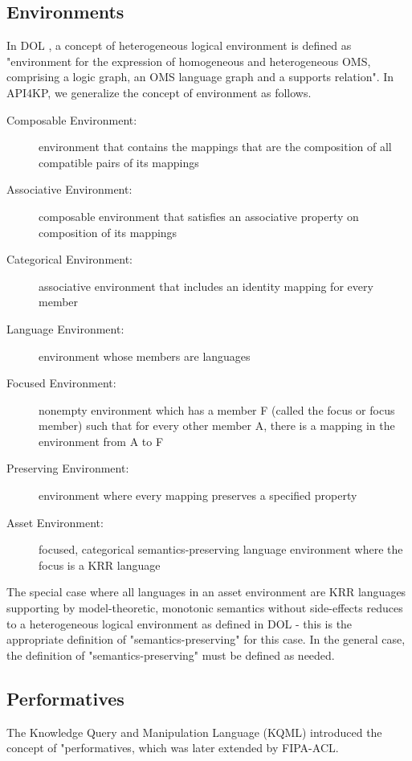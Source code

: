 \documentclass[runningheads]{llncs}
\begin{document}
\subsection{Environments}
In DOL , a concept of heterogeneous logical environment is defined as 
"environment for the
expression of homogeneous and heterogeneous OMS, comprising
a logic graph, an OMS language graph and a supports relation".
In API4KP, we generalize the concept of environment as follows.
\label{krassetenv}
\begin{description}
\item[Composable Environment:] environment that contains the mappings that are the composition of all compatible pairs of its mappings
\item[Associative Environment:] composable environment that satisfies an associative property on composition of its mappings
\item[Categorical Environment:] associative environment that includes an identity mapping for every member
\item[Language Environment:] environment whose members are languages
\item[Focused Environment:] nonempty environment which has a member F (called the focus or focus member) such that for every other member A, there is a mapping in the environment from A to F
\item[Preserving Environment:] environment where every mapping preserves a specified property
\item[Asset Environment:] focused, categorical semantics-preserving language environment where the focus is a KRR language
\end{description}
The special case where all languages in an asset environment are KRR languages supporting by model-theoretic, monotonic semantics without side-effects reduces to a heterogeneous logical environment as defined in DOL - this is the appropriate definition of "semantics-preserving" for this case. In the general case, the definition of "semantics-preserving" must be defined as needed.

\subsection{Performatives}
The Knowledge Query and Manipulation Language (KQML)  introduced the concept of "performatives, which was later extended by FIPA-ACL.
\end{document}

